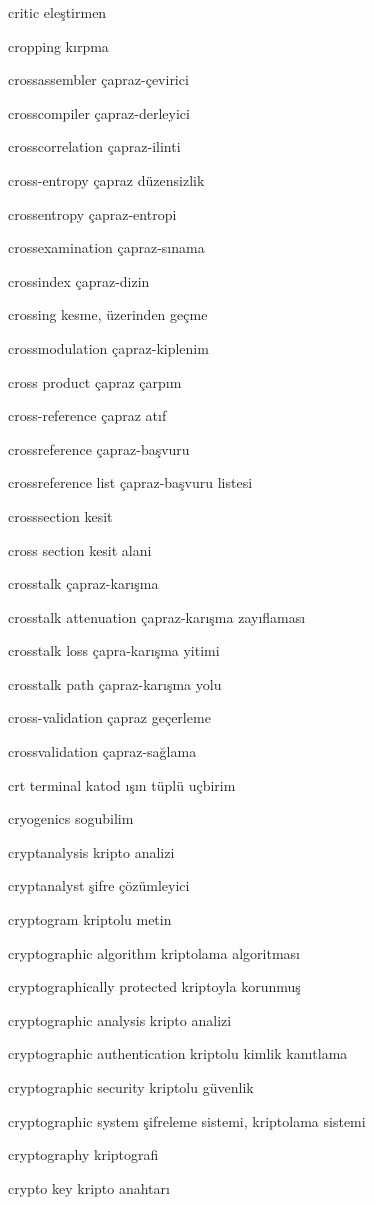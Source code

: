 \documentclass[12pt,fleqn]{article}\usepackage{../../common}
\begin{document}
critic eleştirmen

cropping kırpma

crossassembler çapraz-çevirici

crosscompiler çapraz-derleyici

crosscorrelation çapraz-ilinti

cross-entropy çapraz düzensizlik

crossentropy çapraz-entropi

crossexamination çapraz-sınama

crossindex çapraz-dizin

crossing kesme, üzerinden geçme

crossmodulation çapraz-kiplenim

cross product çapraz çarpım

cross-reference çapraz atıf

crossreference çapraz-başvuru

crossreference list çapraz-başvuru listesi

crosssection kesit

cross section kesit alani

crosstalk çapraz-karışma

crosstalk attenuation çapraz-karışma zayıflaması

crosstalk loss çapra-karışma yitimi

crosstalk path çapraz-karışma yolu

cross-validation çapraz geçerleme

crossvalidation çapraz-sağlama

crt terminal katod ışın tüplü uçbirim

cryogenics sogubilim

cryptanalysis kripto analizi

cryptanalyst şifre çözümleyici

cryptogram kriptolu metin

cryptographic algorithm kriptolama algoritması

cryptographically protected kriptoyla korunmuş

cryptographic analysis kripto analizi

cryptographic authentication kriptolu kimlik kanıtlama

cryptographic security kriptolu güvenlik

cryptographic system şifreleme sistemi, kriptolama sistemi

cryptography kriptografi

crypto key kripto anahtarı
\end{document}
